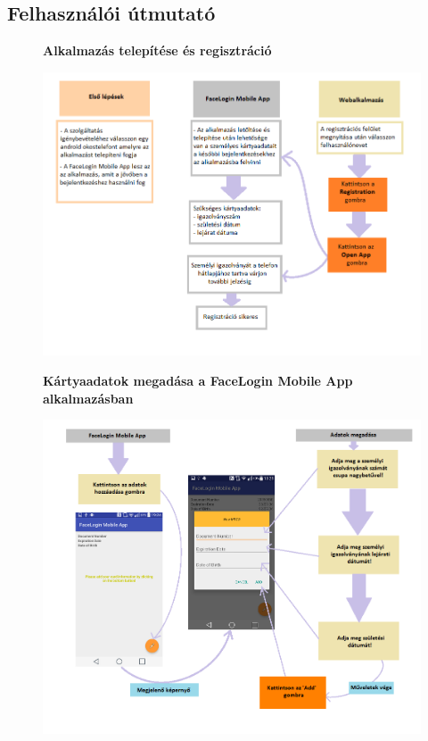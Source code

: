 \subsection{Felhasználói útmutató}


\begin{figure}[h]
 \begin{minipage}{1\textwidth} 
\begin{center} {\textbf{Alkalmazás telepítése és regisztráció}}
\end{center}
\centering
    \includegraphics[scale=0.65]{img/test}
 \end{minipage}
\end{figure}
\newpage
\begin{figure}[h]
 \begin{minipage}{1\textwidth} 
\begin{center} {\textbf{Kártyaadatok megadása a FaceLogin Mobile App alkalmazásban}}
\end{center}
\centering
    \includegraphics[scale=0.6]{img/mobile}
 \end{minipage}
\end{figure}
\newpage

